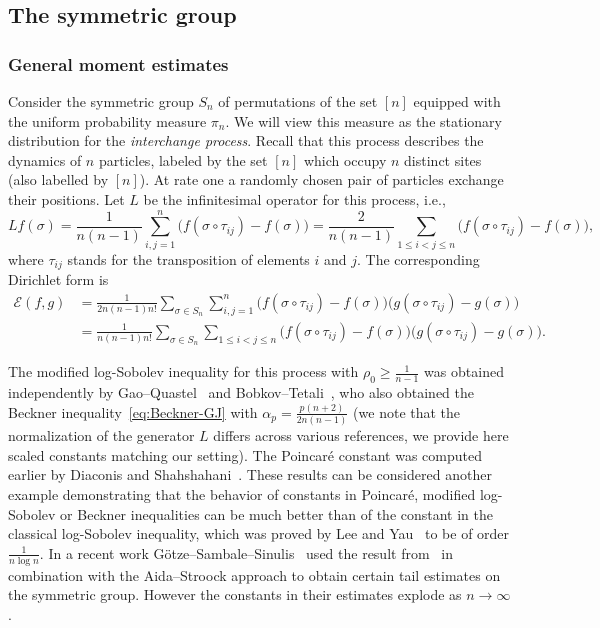 \documentclass[a4paper]{amsart}
\theoremstyle{definition}
\theoremstyle{remark}
\numberwithin{equation}{section}
\newcommand*{\calE}{\mathcal{E}}
\begin{document}
\subsection{The symmetric group}\label{sec:S_n}
\subsubsection{General moment estimates}
Consider the symmetric group $S_n$ of permutations of the set $[n]$ equipped with the uniform probability measure $\pi_n$. We will view this measure as the stationary distribution for the \emph{interchange process}. Recall that this process describes the dynamics of $n$ particles, labeled by the set $[n]$ which occupy $n$ distinct sites (also labelled by $[n]$). At rate one a randomly chosen pair of particles exchange their positions. Let $L$ be the infinitesimal operator for this process, i.e.,
\begin{displaymath}
  L f(\sigma) = \frac{1}{n(n-1)}\sum_{i,j = 1}^n \Big(f(\sigma \circ \tau_{ij}) - f(\sigma)\Big) = \frac{2}{n(n-1)}\sum_{1\le i < j \le n}\Big(f(\sigma \circ \tau_{ij}) - f(\sigma)\Big),
\end{displaymath}
where $\tau_{ij}$ stands for the transposition of elements $i$ and $j$.
The corresponding Dirichlet form is
\begin{align*}
\calE (f,g) &= \frac{1}{2n(n-1)n!}\sum_{\sigma \in S_n} \sum_{i,j=1}^n \Big(f(\sigma\circ \tau_{ij}) - f(\sigma)\Big)\Big( g(\sigma\circ \tau_{ij}) - g(\sigma)\Big)\\
& = \frac{1}{n(n-1)n!}\sum_{\sigma \in S_n} \sum_{1\le i < j\le n}\Big(f(\sigma\circ \tau_{ij}) - f(\sigma)\Big)\Big( g(\sigma\circ \tau_{ij}) - g(\sigma)\Big).
\end{align*}

The modified log-Sobolev inequality for this process with $\rho_0 \ge \frac{1}{n-1}$ 
was obtained independently by Gao--Quastel~\cite{MR2023890} and Bobkov--Tetali~\cite{MR2283379}, who also obtained the Beckner inequality~\eqref{eq:Beckner-GJ} with $\alpha_p = \frac{p(n+2)}{2n(n-1)}$ (we note that the normalization of the generator $L$ differs across various references, we provide here scaled constants matching our setting). The Poincar\'e constant was computed earlier by Diaconis and Shahshahani~\cite{MR626813}. These results can be considered another example demonstrating that the behavior of constants in Poincar\'e, modified log-Sobolev or Beckner inequalities can be much better than of the constant in the classical log-Sobolev inequality, which was proved by Lee and Yau~\cite{MR1675008} to be of order $\frac{1}{n\log n}$. In a recent work G\"otze--Sambale--Sinulis~\cite{gtze2018higher} used the result from~\cite{MR1675008} in combination with the Aida--Stroock approach to obtain certain tail estimates on the symmetric group. However the constants in their estimates explode as $n \to \infty$.
\end{document}
